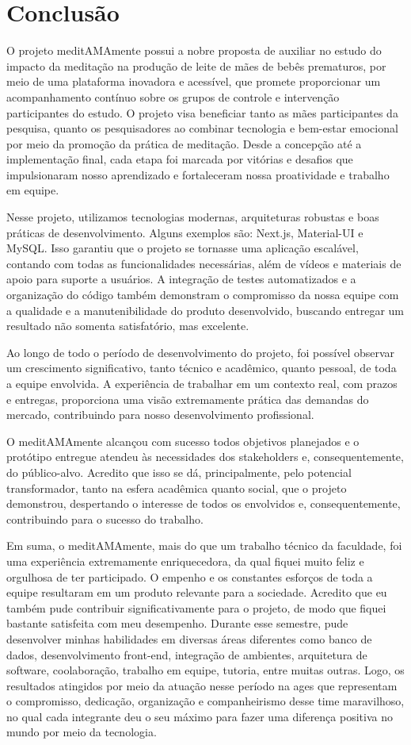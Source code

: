 \section[Conclusão]{Conclusão}

O projeto meditAMAmente possui a nobre proposta de auxiliar no estudo do impacto da meditação na produção de leite de mães de bebês prematuros, por meio de uma plataforma inovadora e acessível, que promete proporcionar um acompanhamento contínuo sobre os grupos de controle e intervenção participantes do estudo. O projeto visa beneficiar tanto as mães participantes da pesquisa, quanto os pesquisadores ao combinar tecnologia e bem-estar emocional por meio da promoção da prática de meditação. Desde a concepção até a implementação final, cada etapa foi marcada por vitórias e desafios que impulsionaram nosso aprendizado e fortaleceram nossa proatividade e trabalho em equipe.

Nesse projeto, utilizamos tecnologias modernas, arquiteturas robustas e boas práticas de desenvolvimento. Alguns exemplos são: Next.js, Material-UI e MySQL. Isso garantiu que o projeto se tornasse uma aplicação escalável, contando com todas as funcionalidades necessárias, além de vídeos e materiais de apoio para suporte a usuários. A integração de testes automatizados e a organização do código também demonstram o compromisso da nossa equipe com a qualidade e a manutenibilidade do produto desenvolvido, buscando entregar um resultado não somenta satisfatório, mas excelente.

Ao longo de todo o período de desenvolvimento do projeto, foi possível observar um crescimento significativo, tanto técnico e acadêmico, quanto pessoal, de toda a equipe envolvida. A experiência de trabalhar em um contexto real, com prazos e entregas, proporciona uma visão extremamente prática das demandas do mercado, contribuindo para nosso desenvolvimento profissional.

O meditAMAmente alcançou com sucesso todos objetivos planejados e o protótipo entregue atendeu às necessidades dos stakeholders e, consequentemente, do público-alvo. Acredito que isso se dá, principalmente, pelo potencial transformador, tanto na esfera acadêmica quanto social, que o projeto demonstrou, despertando o interesse de todos os envolvidos e, consequentemente, contribuindo para o sucesso do trabalho.

Em suma, o meditAMAmente, mais do que um trabalho técnico da faculdade, foi uma experiência extremamente enriquecedora, da qual fiquei muito feliz e orgulhosa de ter participado. O empenho e os constantes esforços de toda a equipe resultaram em um produto relevante para a sociedade. Acredito que eu também pude contribuir significativamente para o projeto, de modo que fiquei bastante satisfeita com meu desempenho. Durante esse semestre, pude desenvolver minhas habilidades em diversas áreas diferentes como banco de dados, desenvolvimento front-end, integração de ambientes, arquitetura de software, coolaboração, trabalho em equipe, tutoria, entre muitas outras. Logo, os resultados atingidos por meio da atuação nesse período na \ac{ages} que representam o compromisso, dedicação, organização e companheirismo desse time maravilhoso, no qual cada integrante deu o seu máximo para fazer uma diferença positiva no mundo por meio da tecnologia.
